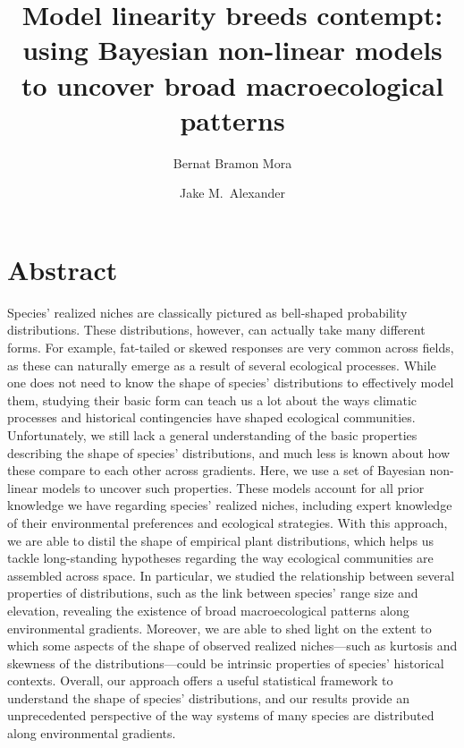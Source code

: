 \documentclass[11pt, a4paper]{article}
\title{\vspace{-1cm}
Model linearity breeds contempt: using Bayesian non-linear models to uncover broad macroecological patterns}
\author[1,*]{\normalsize Bernat Bramon Mora}
\author[1]{\normalsize Jake M.\ Alexander}
\affil[1]{\footnotesize Institute of Integrative Biology, ETH Zürich, Zürich, Switzerland}
\affil[*]{\footnotesize  bernat.bramon@gmail.com}
\date{}
\begin{document}
\maketitle
\linenumbers

\section*{Abstract}
Species' realized niches are classically pictured as bell-shaped probability distributions. These distributions, however, can actually take many different forms. For example, fat-tailed or skewed responses are very common across fields, as these can naturally emerge as a result of several ecological processes. While one does not need to know the shape of species' distributions to effectively model them, studying their basic form can teach us a lot about the ways climatic processes and historical contingencies have shaped ecological communities. Unfortunately, we still lack a general understanding of the basic properties describing the shape of species' distributions, and much less is known about how these compare to each other across gradients. Here, we use a set of Bayesian non-linear models to uncover such properties. These models account for all prior knowledge we have regarding species' realized niches, including expert knowledge of their environmental preferences and ecological strategies. With this approach, we are able to distil the shape of empirical plant distributions, which helps us tackle long-standing hypotheses regarding the way ecological communities are assembled across space. In particular, we studied the relationship between several properties of distributions, such as the link between species' range size and elevation, revealing the existence of broad macroecological patterns along environmental gradients. Moreover, we are able to shed light on the extent to which some aspects of the shape of observed realized niches---such as kurtosis and skewness of the distributions---could be intrinsic properties of species' historical contexts. Overall, our approach offers a useful statistical framework to understand the shape of species' distributions, and our results provide an unprecedented perspective of the way systems of many species are distributed along environmental gradients.
\end{document}
